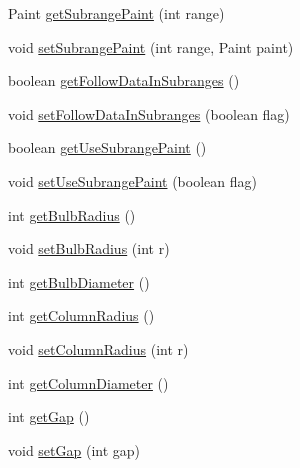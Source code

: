 \begin{DoxyCompactItemize}
\item 
Paint \mbox{\hyperlink{classorg_1_1jfree_1_1chart_1_1plot_1_1_thermometer_plot_ad8e3a6c3ae6832907c36158d77df0e30}{get\+Subrange\+Paint}} (int range)
\item 
void \mbox{\hyperlink{classorg_1_1jfree_1_1chart_1_1plot_1_1_thermometer_plot_a0cee6f90f5442bda141dc407e0af0bdd}{set\+Subrange\+Paint}} (int range, Paint paint)
\item 
boolean \mbox{\hyperlink{classorg_1_1jfree_1_1chart_1_1plot_1_1_thermometer_plot_a9628ebdf3d4c6f3960a95929d4982aa1}{get\+Follow\+Data\+In\+Subranges}} ()
\item 
void \mbox{\hyperlink{classorg_1_1jfree_1_1chart_1_1plot_1_1_thermometer_plot_af3a5653bc5f71de22a8b4128a4b3296a}{set\+Follow\+Data\+In\+Subranges}} (boolean flag)
\item 
boolean \mbox{\hyperlink{classorg_1_1jfree_1_1chart_1_1plot_1_1_thermometer_plot_a315ab774d4acc16d2256da66c3a427b0}{get\+Use\+Subrange\+Paint}} ()
\item 
void \mbox{\hyperlink{classorg_1_1jfree_1_1chart_1_1plot_1_1_thermometer_plot_a042ea3581fd39e5ba42636c02b37c50d}{set\+Use\+Subrange\+Paint}} (boolean flag)
\item 
int \mbox{\hyperlink{classorg_1_1jfree_1_1chart_1_1plot_1_1_thermometer_plot_a37a2c1afb3ae05c507d06c96ca60741e}{get\+Bulb\+Radius}} ()
\item 
void \mbox{\hyperlink{classorg_1_1jfree_1_1chart_1_1plot_1_1_thermometer_plot_a8b0b038ef390e5609be37290c3307c72}{set\+Bulb\+Radius}} (int r)
\item 
int \mbox{\hyperlink{classorg_1_1jfree_1_1chart_1_1plot_1_1_thermometer_plot_a835baa52221fa566e1dfe2867aa220f4}{get\+Bulb\+Diameter}} ()
\item 
int \mbox{\hyperlink{classorg_1_1jfree_1_1chart_1_1plot_1_1_thermometer_plot_a74b63300dd2a147c902542e3b3c98085}{get\+Column\+Radius}} ()
\item 
void \mbox{\hyperlink{classorg_1_1jfree_1_1chart_1_1plot_1_1_thermometer_plot_abdca1e8b671c03e4cfa948b622a93b29}{set\+Column\+Radius}} (int r)
\item 
int \mbox{\hyperlink{classorg_1_1jfree_1_1chart_1_1plot_1_1_thermometer_plot_a2acfcde8d30779ac772e20ff81823598}{get\+Column\+Diameter}} ()
\item 
int \mbox{\hyperlink{classorg_1_1jfree_1_1chart_1_1plot_1_1_thermometer_plot_a2a794babab6a5b7b75b792c19b39b3f5}{get\+Gap}} ()
\item 
void \mbox{\hyperlink{classorg_1_1jfree_1_1chart_1_1plot_1_1_thermometer_plot_a2589f0ef33b49f571f4f2e42e1e70cc3}{set\+Gap}} (int gap)

\end{DoxyCompactItemize}
